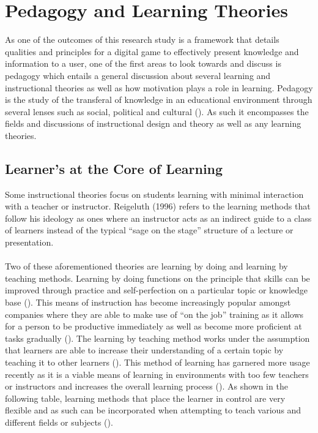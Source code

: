 \section{Pedagogy and Learning Theories}
As one of the outcomes of this research study is a framework that details qualities and principles for a digital game to effectively present knowledge and information to a user, one of the first areas to look towards and discuss is pedagogy which entails a general discussion about several learning and instructional theories as well as how motivation plays a role in learning. Pedagogy is the study of the transferal of knowledge in an educational environment through several lenses such as social, political and cultural (\cite{Li2012}). As such it encompasses the fields and discussions of instructional design and theory as well as any learning theories.

\subsection{Learner's at the Core of Learning}
Some instructional theories focus on students learning with minimal interaction with a teacher or instructor. Reigeluth (1996) refers to the learning methods that follow his ideology as ones where an instructor acts as an indirect guide to a class of learners instead of the typical “sage on the stage” structure of a lecture or presentation. 
\\\\
Two of these aforementioned theories are learning by doing and learning by teaching methods. Learning by doing functions on the principle that skills can be improved through practice and self-perfection on a particular topic or knowledge base (\cite{Fisch2009}). This means of instruction has become increasingly popular amongst companies where they are able to make use of “on the job” training as it allows for a person to be productive immediately as well as become more proficient at tasks gradually (\cite{Fisch2009}). The learning by teaching method works under the assumption that learners are able to increase their understanding of a certain topic by teaching it to other learners (\cite{Fisch2009}). This method of learning has garnered more usage recently as it is a viable means of learning in environments with too few teachers or instructors and increases the overall learning process (\cite{Fisch2009}). As shown in the following table, learning methods that place the learner in control are very flexible and as such can be incorporated when attempting to teach various and different fields or subjects (\cite{Ackoff1991}).

